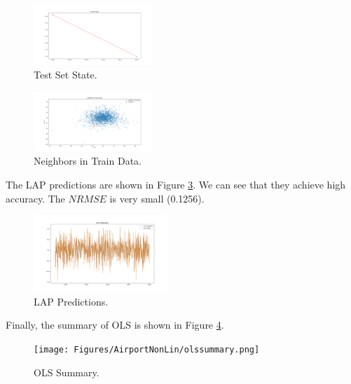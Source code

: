 \documentclass[conference]{IEEEtran}
\begin{document}
\begin{figure}[ht]
    \centering
    \includegraphics[width=0.40\textwidth]{Figures/AirportNonLin/Test Set State.png}
    \caption{Test Set State.}
    \label{TESTA}
\end{figure}
\vspace{80mm}

\begin{figure}[ht]
    \centering
    \includegraphics[width=0.40\textwidth]{Figures/AirportNonLin/Neighbors in Train Data.png}
    \caption{Neighbors in Train Data.}
    \label{traina}
\end{figure}

The LAP predictions are shown in Figure \ref{lapa}. We can see that they achieve high accuracy. The $NRMSE$ is very small (0.1256).

\begin{figure}[ht]
    \centering
    \includegraphics[width=0.45\textwidth]{Figures/AirportNonLin/LAP Predictions.png}
    \caption{LAP Predictions.}
    \label{lapa}
\end{figure}

Finally, the summary of OLS is shown in Figure \ref{tabla}. 

\begin{figure}[ht]
    \centering
    \texttt{[image: Figures/AirportNonLin/olssummary.png]}
    \caption{OLS Summary.}
    \label{tabla}
\end{figure}

\end{document}
